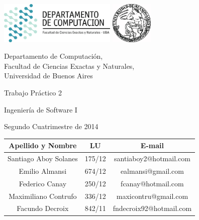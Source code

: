 \documentclass[a4paper, 10pt, twoside]{article}
\begin{document}


\thispagestyle{caratula}

\begin{center}

\includegraphics[height=2cm]{DC.png} 
\hfill
\includegraphics[height=2cm]{UBA.jpg} 

\vspace{2cm}

Departamento de Computación,\\
Facultad de Ciencias Exactas y Naturales,\\
Universidad de Buenos Aires

\vspace{4cm}

\begin{Huge}
Trabajo Práctico 2
\end{Huge}

\vspace{0.5cm}

\begin{Large}
Ingeniería de Software I
\end{Large}

\vspace{1cm}

Segundo Cuatrimestre de 2014

\vspace{4cm}

\begin{tabular}{|c|c|c|}
\hline
Apellido y Nombre & LU & E-mail\\
\hline
Santiago Aboy Solanes & 175/12 & santiaboy2@hotmail.com \\
Emilio Almansi & 674/12 & ealmansi@gmail.com \\
Federico Canay & 250/12 & fcanay@hotmail.com \\
Maximiliano Contrufo & 336/12 & maxicontru@gmail.com  \\
Facundo Decroix & 842/11 & fndecroix92@hotmail.com \\
\hline
\end{tabular}

\end{center}
\end{document}
